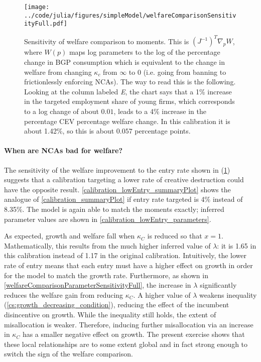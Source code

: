 \documentclass[11pt,english]{article}
\theoremstyle{remark}
\begin{document}
\begin{figure}[]
	\texttt{[image: ../code/julia/figures/simpleModel/welfareComparisonSensitivityFull.pdf]}
	\caption{Sensitivity of welfare comparison to moments. This is $(J^{-1})^T \nabla_p W$, where $W(p)$ maps log parameters to the log of the percentage change in BGP consumption which is equivalent to the change in welfare from changing $\kappa_c$ from $\infty$ to $0$ (i.e. going from banning to frictionlessly enforcing NCAs). The way to read this is the following. Looking at the column labeled \textit{E}, the chart says that a 1\% increase in the targeted employment share of young firms, which corresponds to a log change of about $0.01$, leads to a 4\% increase in the percentage CEV percentage welfare change. In this calibration it is about 1.42\%, so this is about $0.057$ percentage points.}
	\label{welfareComparisonSensitivityFull}
\end{figure}


\paragraph{When are NCAs bad for welfare?}

The sensitivity of the welfare improvement to the entry rate shown in (\ref{welfareComparisonSensitivityFull}) suggests that a calibration targeting a lower rate of creative destruction could have the opposite result. \autoref{calibration_lowEntry_summaryPlot} shows the analogue of \autoref{calibration_summaryPlot} if entry rate targeted is 4\% instead of 8.35\%. The model is again able to match the moments exactly; inferred parameter values are shown in \autoref{calibration_lowEntry_parameters}.

As expected, growth and welfare fall when $\kappa_C$ is reduced so that $x = 1$. Mathematically, this results from the much higher inferred value of $\lambda$: it is 1.65 in this calibration instead of 1.17 in the original calibration. Intuitively, the lower rate of entry means that each entry must have a higher effect on growth in order for the model to match the growth rate. Furthermore, as shown in \autoref{welfareComparisonParameterSensitivityFull}, the increase in $\lambda$ significantly reduces the welfare gain from reducing $\kappa_C$. A higher value of $\lambda$ weakens inequality (\ref{cs:growth_decreasing_condition}), reducing the effect of the incumbent disincentive on growth. While the inequality still holds, the extent of misallocation is weaker. Therefore, inducing further misallocation via an increase in $\kappa_C$ has a smaller negative effect on growth. The present exercise shows that these local relationships are to some extent global and in fact strong enough to switch the sign of the welfare comparison.
\end{document}
